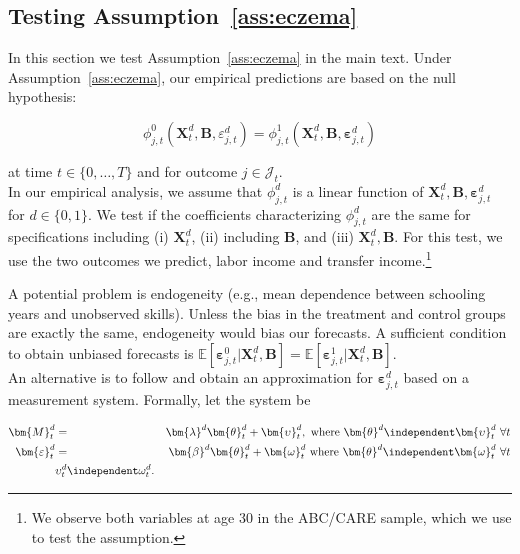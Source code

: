 \subsection{Testing  Assumption~\ref{ass:eczema}} \label{app:invariance}

\noindent In this section we test Assumption~\ref{ass:eczema} in the main text. Under Assumption~\ref{ass:eczema}, our empirical predictions are based on the null hypothesis:

\begin{equation}
\phi_{j,t}^0 \left( \bm{X}_{t}^d, \bm{B}, \varepsilon_{j,t}^d\right) = \phi_{j,t}^1 \left( \bm{X}_{t}^d, \bm{B}, \bm{\varepsilon}_{j,t}^d\right) \label{eq:eqs}
\end{equation}

\noindent at time $t \in \{0, \ldots, T\}$ and for outcome $j \in \mathcal{J}_{t}$.\\

\noindent In our empirical analysis, we assume that $\phi_{j,t}^d$ is a linear function of $ \bm{X}_{t}^d, \bm{B}, \bm{\varepsilon}_{j,t}^d$ for $d \in \{0,1\}$. We test if the coefficients characterizing $\phi_{j,t}^d$ are the same for specifications including (i) $\bm{X}_{t}^d$, (ii) including  $\bm{B}$, and (iii) $\bm{X}_{t}^d, \bm{B}$. For this test, we use the two outcomes we predict, labor income and transfer income.\footnote{We observe both variables at age 30 in the ABC/CARE sample, which we use to test the assumption.}

\noindent A potential problem is endogeneity (e.g., mean dependence between schooling years and unobserved skills). Unless the bias in the treatment and control groups are exactly the same, endogeneity would bias our forecasts. A sufficient condition to obtain unbiased forecasts is $\mathbb{E} \left[ \bm{\varepsilon}_{j,t}^0 | \bm{X}_{t}^d, \bm{B} \right] = \mathbb{E} \left[ \bm{\varepsilon}_{j,t}^1 | \bm{X}_{t}^d, \bm{B} \right]$.\\

\noindent An alternative is to follow \citet{Heckman_Pinto_etal_2013_PerryFactor} and obtain an approximation for  $\bm{\varepsilon}_{j,t}^d$ based on a measurement system. Formally, let the system be

\begin{eqnarray}
\bm{M}_{t}^d     &=& \bm{\lambda}^d \bm{\theta}_{t}^d +  \bm{\upsilon}_t^d, \text{ where } \bm{\theta}^d  \independent \bm{\upsilon}_{t}^d \ \forall t \\ \nonumber
\bm{\varepsilon}_{t}^d &=& \bm{\beta}^d \bm{\theta}_{t}^d + \bm{\omega}_{t}^d \text{ where } \bm{\theta}^d  \independent \bm{\omega}_{t}^d \ \forall t \\ \nonumber
&\upsilon_{t}^d \independent \omega_{t}^d.
\label{eq:msystem}
\end{eqnarray}

